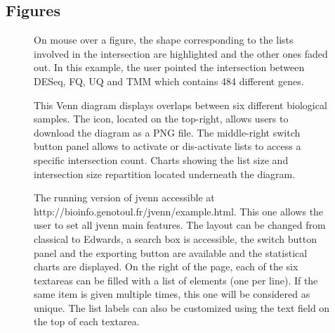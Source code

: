 \documentclass{bmcart}
\begin{document}
\begin{backmatter}


\section*{Figures}
  \begin{figure}[h!]
  \caption{
  	  On mouse over a figure, the shape corresponding to the lists involved in
      the intersection are highlighted and the other ones faded out. In
      this example, the user pointed the intersection between DESeq, FQ, UQ and
      TMM which contains 484 different genes.
      }\label{fig::features}
   \end{figure}

  \begin{figure}[h!]
  \caption{
  	  This Venn diagram displays overlaps between six different biological
      samples. The icon, located on the top-right, allows users to download the
      diagram as a PNG file. The middle-right switch button
      panel allows to activate or dis-activate lists to access a specific
      intersection count. Charts showing the list size and intersection size 
      repartition located underneath the diagram.}\label{fig::edwards}
   \end{figure}
      
  \begin{figure}[h!]
  \caption{
	  The running version of jvenn accessible at
	  http://bioinfo.genotoul.fr/jvenn/example.html. This one allows the user to
	  set all jvenn main features. The layout can be changed from classical to
	  Edwards, a search box is accessible, the switch button panel and the
	  exporting button are available and the statistical charts are displayed.
	  On the right of the page, each of the six textareas can be filled with a
	  list of elements (one per line). If the same item is given multiple times,
	  this one will be considered as unique. The list labels can also be customized
	  using the text field on the top of each textarea.}\label{fig::web} 
  \end{figure}


\end{backmatter}
\end{document}

